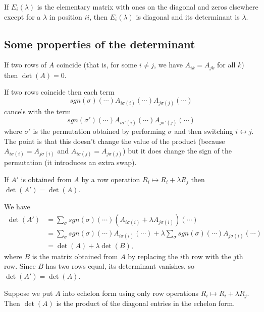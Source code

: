 \documentclass{article}
\begin{document}
\begin{Example}\label{exm:detelemII}
If \(E_i(\lambda)\) is the elementary matrix with ones on the
diagonal and zeros elsewhere except for a \(\lambda\) in position
\(ii\), then \(E_i(\lambda)\) is diagonal and its determinant is
\(\lambda\).


\end{Example}
\subsection{Some properties of the determinant}


\begin{Lemma}\label{lma:detantisym}
If two rows of \(A\) coincide (that is, for some \(i\neq j\), we
have \(A_{ik}=A_{jk}\) for all \(k\)) then \(\det(A)=0\).
\end{Lemma}
\begin{Proof}
If two rows coincide then each term
\[sgn(\sigma)(\cdots)A_{i\sigma(i)}(\cdots)A_{j\sigma(j)}(\cdots)\]
cancels with the term
\[sgn(\sigma')(\cdots)A_{i\sigma'(i)}(\cdots)A_{j\sigma'(j)}(\cdots)\]
where \(\sigma'\) is the permutation obtained by performing
\(\sigma\) and then switching \(i\leftrightarrow j\). The point is
that this doesn't change the value of the product (because
\(A_{i\sigma(i)}=A_{j\sigma(i)}\) and
\(A_{i\sigma(j)}=A_{j\sigma(j)}\)) but it does change the sign of
the permutation (it introduces an extra swap). \qedhere


\end{Proof}
\begin{Lemma}\label{lma:detrowI}
If \(A'\) is obtained from \(A\) by a row operation \(R_i\mapsto
R_i+\lambda R_j\) then \(\det(A')=\det(A)\).
\end{Lemma}
\begin{Proof}
We have
\begin{align*}
\det(A')&=\sum_{\sigma}sgn(\sigma)(\cdots)(A_{i\sigma(i)}+\lambda A_{j\sigma(i)})(\cdots)\\
&=\sum_{\sigma}sgn(\sigma)(\cdots)A_{i\sigma(i)}(\cdots)+\lambda\sum_{\sigma}sgn(\sigma)(\cdots)A_{j\sigma(i)}(\cdots)\\
&=\det(A)+\lambda\det(B),
\end{align*}
where \(B\) is the matrix obtained from \(A\) by replacing the
\(i\)th row with the \(j\)th row. Since \(B\) has two rows equal,
its determinant vanishes, so \(\det(A')=\det(A)\). \qedhere


\end{Proof}
\begin{Theorem}\label{thm:detech}
Suppose we put \(A\) into echelon form using only row operations
\(R_i\mapsto R_i+\lambda R_j\). Then \(\det(A)\) is the product of
the diagonal entries in the echelon form.
\end{Theorem}
\end{document}
